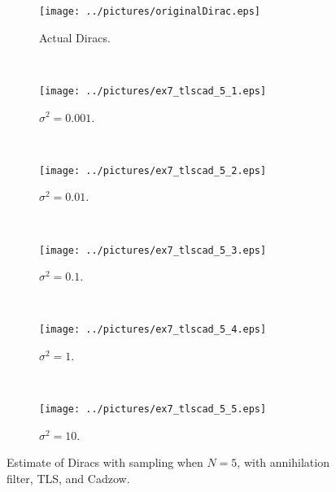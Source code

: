 \documentclass[11pt,a4paper]{report}
\begin{document}
\begin{figure}[H]
    \captionsetup[subfigure]{position=b}
    \centering
    \begin{subfigure}{0.49\textwidth}
        \texttt{[image: ../pictures/originalDirac.eps]}
        \caption{Actual Diracs.}
        \label{fig:ex7_tlscad_5_0}
    \end{subfigure}
    ~
    \begin{subfigure}{0.49\textwidth}
        \texttt{[image: ../pictures/ex7\_tlscad\_5\_1.eps]}
        \caption{$\sigma^2 = 0.001$.}
        \label{fig:ex7_tlscad_5_1}
    \end{subfigure}
    \\
    \begin{subfigure}{0.49\textwidth}
        \texttt{[image: ../pictures/ex7\_tlscad\_5\_2.eps]}
        \caption{$\sigma^2 = 0.01$.}
        \label{fig:ex7_tlscad_5_2}
    \end{subfigure}
    ~
    \begin{subfigure}{0.49\textwidth}
        \texttt{[image: ../pictures/ex7\_tlscad\_5\_3.eps]}
        \caption{$\sigma^2 = 0.1$.}
        \label{fig:ex7_tlscad_5_3}
    \end{subfigure}
    \\
    \begin{subfigure}{0.49\textwidth}
        \texttt{[image: ../pictures/ex7\_tlscad\_5\_4.eps]}
        \caption{$\sigma^2 = 1$.}
        \label{fig:ex7_tlscad_5_4}
    \end{subfigure}
    ~
    \begin{subfigure}{0.49\textwidth}
        \texttt{[image: ../pictures/ex7\_tlscad\_5\_5.eps]}
        \caption{$\sigma^2 = 10$.}
        \label{fig:ex7_tlscad_5_5}
    \end{subfigure}

    \caption{Estimate of Diracs with sampling when $N = 5$, with annihilation filter, TLS, and Cadzow.}
    \label{fig:ex7_tlscad_5}
\end{figure}
\end{document}
